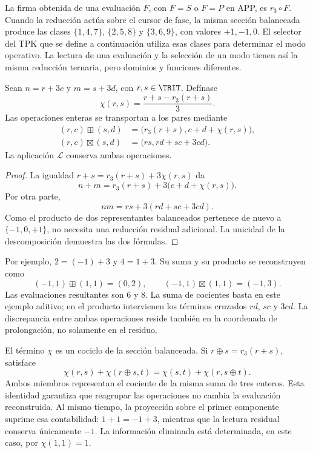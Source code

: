La firma obtenida de una evaluación \(F\), con \(F=S\) o \(F=P\) en APP,
es \(r_3\circ F\). Cuando la reducción actúa sobre el cursor de fase, la misma
sección balanceada produce las clases \(\{1,4,7\}\), \(\{2,5,8\}\) y
\(\{3,6,9\}\), con valores \(+1,-1,0\). El selector del TPK que se define
a continuación utiliza esas clases para determinar el modo operativo.
La lectura de una evaluación y la selección de un modo tienen así la misma
reducción ternaria, pero dominios y funciones diferentes.

\begin{proposition}
\label{x_reciprocidad:trit-ampl-prop-aritmetica}
Sean \(n=r+3c\) y \(m=s+3d\), con \(r,s\in\TRIT\). Defínase
\[
 \chi(r,s)=\frac{r+s-r_3(r+s)}3.
\]
Las operaciones enteras se transportan a los pares mediante
\begin{align}
 (r,c)\boxplus(s,d)
 &=\bigl(r_3(r+s),c+d+\chi(r,s)\bigr),
 \label{x_reciprocidad:trit-ampl-eq-suma}\\
 (r,c)\boxtimes(s,d)
 &=\bigl(rs,rd+sc+3cd\bigr).
 \label{x_reciprocidad:trit-ampl-eq-producto}
\end{align}
La aplicación \(\mathcal L\) conserva ambas operaciones.
\end{proposition}
\begin{proof}
La igualdad \(r+s=r_3(r+s)+3\chi(r,s)\) da
\[
 n+m=r_3(r+s)+3\bigl(c+d+\chi(r,s)\bigr).
\]
Por otra parte,
\[
 nm=rs+3(rd+sc+3cd).
\]
Como el producto de dos representantes balanceados pertenece de nuevo a
\(\{-1,0,+1\}\), no necesita una reducción residual adicional. La unicidad
de la descomposición demuestra las dos fórmulas.
\end{proof}

Por ejemplo, \(2=(-1)+3\) y \(4=1+3\). Su suma y su producto se reconstruyen
como
\[
 (-1,1)\boxplus(1,1)=(0,2),\qquad
 (-1,1)\boxtimes(1,1)=(-1,3).
\]
Las evaluaciones resultantes son \(6\) y \(8\). La suma de cocientes basta
en este ejemplo aditivo; en el producto intervienen los términos cruzados
\(rd\), \(sc\) y \(3cd\). La discrepancia entre ambas operaciones reside
también en la coordenada de prolongación, no solamente en el residuo.

El término \(\chi\) es un cociclo de la sección balanceada. Si
\(r\oplus s=r_3(r+s)\), satisface
\[
 \chi(r,s)+\chi(r\oplus s,t)
 =\chi(s,t)+\chi(r,s\oplus t).
\]
Ambos miembros representan el cociente de la misma suma de tres enteros.
Esta identidad garantiza que reagrupar las operaciones no cambia la
evaluación reconstruida. Al mismo tiempo, la proyección sobre el primer
componente suprime esa contabilidad: \(1+1=-1+3\), mientras que la lectura
residual conserva únicamente \(-1\). La información eliminada está
determinada, en este caso, por \(\chi(1,1)=1\).

